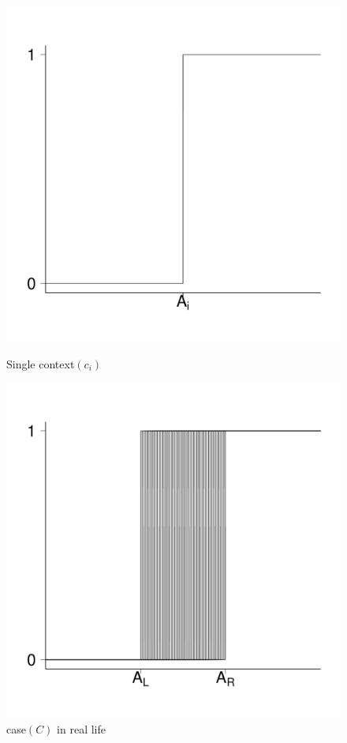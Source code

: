 \documentclass{article}
\begin{document}
\begin{figure}[ht]
	\centering
	\begin{minipage}[t]{0.48\textwidth}
	\centerline{\includegraphics[scale=0.25]{plot2.pdf}}
	\caption{Single context$(c_i)$}
	\end{minipage}
	\begin{minipage}[t]{0.48\textwidth}
	\centerline{\includegraphics[scale=0.25]{plot4.pdf}}
	\caption{case$(C)$ in real life}
	\end{minipage}
\end{figure}
\end{document}

